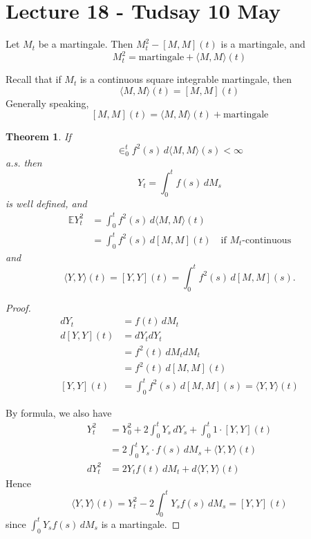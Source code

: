 \documentclass[10pt, oneside, reqno]{amsart}
\theoremstyle{plain}%
\newtheorem{thm}{Theorem}[section]
\theoremstyle{definition}
\theoremstyle{remark}
\newcommand{\E}{\mathbb{E}}
\begin{document}



\section{Lecture 18 - Tudsay 10 May} %
\label{sec:lecture_18_wednesday_10_may}

Let $M_t$ be a martingale.  Then $M_t^2 - [M, M](t)$ is a martingale, and \[
    M_t^2 = \text{martingale} + \langle M, M \rangle(t)
\]

Recall that if $M_t$ is a continuous square integrable martingale, then \[
    \langle M, M \rangle(t) = [M, M](t)
\]  Generally speaking, \[
    [M, M](t) = \langle M, M \rangle (t) + \text{martingale}
\]

\begin{thm}
     If \[
        \in_0^t f^2(s) \, d\langle M , M \rangle(s) < \infty
    \] a.s. then \[
        Y_t = \int_0^t f(s) \, dM_s
    \] is well defined, and \begin{align*}
        \E Y_t^2 &= \int_0^t f^2(s) \, d\langle M, M \rangle
    (t) \\
    &= \int_0^t f^2(s) \, d[M,M](t) \quad \text{if $M_t$-continuous}
    \end{align*} and \[
        \langle Y, Y \rangle(t) = [Y, Y](t) = \int_0^t f^2(s) \, d[M, M](s).  
    \]
\end{thm} 
\begin{proof}
    \begin{align*}
        dY_t &= f(t) \, dM_t \\
        d[Y, Y](t) &= dY_t dY_t \\
                    &= f^2(t) \, dM_t dM_t \\
                     &= f^2(t) \, d[M, M](t) \\
        [Y, Y](t) &= \int_0^t f^2(s) \, d[M, M](s) = \langle Y, Y \rangle(t)  
    \end{align*}
    
    By \itos formula, we also have \begin{align*}
        Y_t^2 &= Y_0^2 + 2 \int_0^t Y_s \, dY_s + \int_0^t 1 \cdot [ Y, Y ](t)  \\
                &= 2 \int_0^t Y_s \cdot f(s) \, dM_s + \langle Y, Y \rangle(t) \\
        dY_t^2      &= 2 Y_t f(t) \, dM_t + d \langle Y, Y \rangle(t)
    \end{align*}  Hence \[
        \langle Y, Y \rangle(t) = Y_t^2 - 2 \int_0^t Y_s f(s) \, dM_s = [Y, Y](t) 
    \] since $\int_0^t Y_s f(s) \, dM_s$ is a martingale.
\end{proof}
\end{document}
